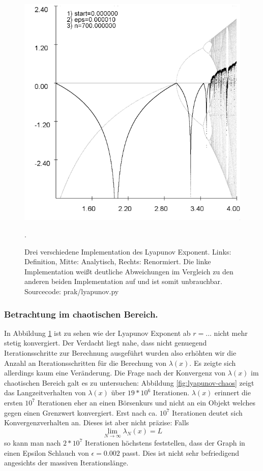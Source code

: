 \documentclass{scrartcl}
\begin{document}
\begin{figure}
\includegraphics[scale=0.28]{iteration/lyapunov-3}
\caption{Drei verschiedene Implementation des Lyapunov Exponent. Links: Definition, Mitte: Analytisch, Rechts: Renormiert. Die linke Implementation weißt deutliche Abweichungen im Vergleich zu den anderen beiden Implementation auf und ist somit unbrauchbar. Sourcecode: prak/lyapunov.py}. 
\label{fig:lyapunov}
\end{figure}
 
\subsubsection{Betrachtung im chaotischen Bereich.}
In Abbildung \ref{fig:lyapunov} ist zu sehen wie der Lyapunov Exponent ab $r=...$ nicht mehr stetig konvergiert. 
Der Verdacht liegt nahe, dass nicht genuegend Iterationsschritte zur Berechnung ausgeführt wurden also erhöhten wir die Anzahl an Iterationsschritten für die Berechung von $\lambda(x)$. Es zeigte sich allerdings kaum eine Veränderung. Die Frage nach der Konvergenz von $\lambda(x)$ im chaotischen Bereich galt es zu untersuchen: Abbildung \ref{fig:lyapunov-chaos} zeigt das Langzeitverhalten von $\lambda(x)$ über $19*10^6$ Iterationen. $\lambda(x)$ erinnert die ersten $10^7$ Iterationen eher an einen Börsenkurs und nicht an ein Objekt welches gegen einen Grenzwert konvergiert. Erst nach ca. $10^7$ Iterationen deutet sich Konvergenzverhalten an. Dieses ist aber nicht präzise: Falls 
\begin{equation}
\lim_{N \rightarrow \infty} \lambda_N(x) = L
\end{equation}
so kann man nach $2*10^7$ Iterationen höchstens feststellen, dass der Graph in einen Epsilon Schlauch von $\epsilon=0.002$ passt. Dies ist nicht sehr befriedigend angesichts der massiven Iterationslänge.  
 
\end{document}

